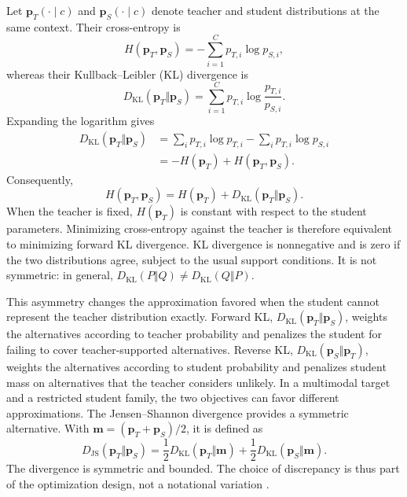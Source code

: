Let \(\mathbf p_T(\cdot\mid c)\) and
\(\mathbf p_S(\cdot\mid c)\) denote teacher and student distributions
at the same context.  Their cross-entropy is
\begin{equation}
    H(\mathbf p_T,\mathbf p_S)
    =-\sum_{i=1}^{C}p_{T,i}\log p_{S,i},
    \label{eq:distillation-cross-entropy}
\end{equation}
whereas their Kullback--Leibler (KL) divergence is
\begin{equation}
    D_{\mathrm{KL}}(\mathbf p_T\Vert\mathbf p_S)
    =\sum_{i=1}^{C}p_{T,i}
    \log\frac{p_{T,i}}{p_{S,i}}.
    \label{eq:distillation-forward-kl}
\end{equation}
Expanding the logarithm gives
\begin{align}
    D_{\mathrm{KL}}(\mathbf p_T\Vert\mathbf p_S)
    &=\sum_i p_{T,i}\log p_{T,i}
      -\sum_i p_{T,i}\log p_{S,i}\nonumber\\
    &=-H(\mathbf p_T)+H(\mathbf p_T,\mathbf p_S).
    \label{eq:distillation-kl-cross-entropy-identity}
\end{align}
Consequently,
\begin{equation}
    H(\mathbf p_T,\mathbf p_S)
    =H(\mathbf p_T)+D_{\mathrm{KL}}(\mathbf p_T\Vert\mathbf p_S).
    \label{eq:distillation-ce-kl-identity}
\end{equation}
When the teacher is fixed, \(H(\mathbf p_T)\) is constant with respect
to the student parameters.  Minimizing cross-entropy against the teacher is
therefore equivalent to minimizing forward KL divergence.  KL divergence is
nonnegative and is zero if the two distributions agree, subject to the usual
support conditions.  It is not symmetric: in general,
\(D_{\mathrm{KL}}(P\Vert Q)\neq D_{\mathrm{KL}}(Q\Vert P)\).

This asymmetry changes the approximation favored when the student cannot
represent the teacher distribution exactly.  Forward KL,
\(D_{\mathrm{KL}}(\mathbf p_T\Vert\mathbf p_S)\), weights the
alternatives according to teacher probability and penalizes the student for
failing to cover teacher-supported alternatives.  Reverse KL,
\(D_{\mathrm{KL}}(\mathbf p_S\Vert\mathbf p_T)\), weights the
alternatives according to student probability and penalizes student mass on
alternatives that the teacher considers unlikely.  In a multimodal target and
a restricted student family, the two objectives can favor different
approximations.  The Jensen--Shannon divergence provides a symmetric
alternative.  With
\(\mathbf m=(\mathbf p_T+\mathbf p_S)/2\), it is defined as
\begin{equation}
    D_{\mathrm{JS}}(\mathbf p_T\Vert\mathbf p_S)
    =\frac{1}{2}D_{\mathrm{KL}}(\mathbf p_T\Vert\mathbf m)
    +\frac{1}{2}D_{\mathrm{KL}}(\mathbf p_S\Vert\mathbf m).
    \label{eq:distillation-js}
\end{equation}
The divergence is symmetric and bounded.  The choice of discrepancy is thus
part of the optimization design, not a notational variation
\parencite{Song2026OnPolicyDistillation}.

